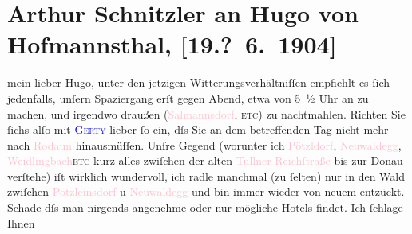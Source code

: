 

               \section[Arthur Schnitzler an Hugo von Hofmannsthal, {[}19.? 6. 1904{]}]{ Arthur Schnitzler an Hugo von Hofmannsthal, {[}19.? 6. 1904{]}}\nopagebreak{}\rehead{ }\normalsize\beginnumbering{} \toendnotes[C]{\smallbreak\pagebreak[2]} 
\toendnotes[C]{\smallbreak}\pstart{}{\pb}mein lieber Hugo, \pend\pstart
           unter den jetzigen Witterungsverhältniſſen empfiehlt es ſich jedenfalls, unſern
               Spaziergang erſt gegen Abend, etwa von 5 ½ Uhr an zu
               machen, und irgendwo draußen (\textcolor{pink}{Salmannsdorf}{}\ledrightnote{\textcolor{pink}{Salmannsdorf}}, \textsc{etc}) zu nachtmahlen. Richten Sie ſichs alſo mit \textcolor{blue}{\textsc{Gerty}}{}\ledrightnote{\textcolor{blue}{Gertrude von Hofmannsthal}} lieber ſo ein, dſs Sie an dem betreffenden Tag nicht mehr nach \textcolor{pink}{Rodaun}{}\ledrightnote{\textcolor{pink}{Rodaun}} hinausmüſſen. Unſre Gegend (worunter ich \textcolor{pink}{Pötzldorf}{}\ledrightnote{\textcolor{pink}{Pötzleinsdorf}}, \textcolor{pink}{Neuwaldegg}{}\ledrightnote{\textcolor{pink}{Neuwaldegg}}, {\pb}\textcolor{pink}{Weidlingbach}{}\ledrightnote{\textcolor{pink}{Weidlingbach}}{ }\textsc{etc} kurz alles zwiſchen der alten \textcolor{pink}{Tullner Reichſtraße}{}\ledrightnote{\textcolor{pink}{Exelbergstraße}} bis zur Donau verſtehe) iſt wirklich wundervoll, ich radle manchmal (zu
               ſelten) nur in den Wald zwiſchen \textcolor{pink}{Pötzleinsdorf}{}\ledrightnote{\textcolor{pink}{Pötzleinsdorf}} u \textcolor{pink}{Neuwaldegg}{}\ledrightnote{\textcolor{pink}{Neuwaldegg}} und bin immer wieder von neuem entzückt.
               Schade dſs man nirgends angenehme oder nur mögliche Hotels findet. Ich ſchlage Ihnen
